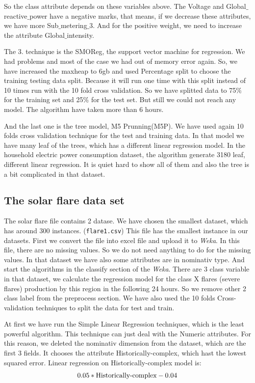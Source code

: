 \documentclass[a4paper]{article}
\begin{document}
So the class attribute depends on these variables above. The Voltage and Global$\_$reactive$\_$power have a negative marks, that means, if we decrease these attributes, we have more Sub$\_$metering$\_$3. And for the positive weight, we need to increase the attribute Global$\_$intensity.

The 3. technique is the SMOReg, the support vector machine for regression. We had problems and most of the case we had out of memory error again. So, we have increased the maxheap to 6gb and used Percentage split to choose the training testing data split. Because it will run one time with this split instead of 10 times run with the 10 fold cross validation. So we have splitted data to 75\% for the training set and 25\% for the test set. But still we could not reach any model. The algorithm have taken more than 6 hours.

And the last one is the tree model, M5 Prunning(M5P). We have used again 10 folds cross validation technique for the test and training data. In that model we have many leaf of the trees, which has a different linear regression model. In the household electric power consumption dataset, the algorithm generate 3180 leaf, different linear regression. It is quiet hard to show all of them and also the tree is a bit complicated in that dataset.

\subsection{The solar flare data set}
The solar flare file contains 2 datase. We have chosen the smallest dataset, which has around 300 instances. ({\tt flare1.csv}) This file has the smallest instance in our datasets. First we convert the file into excel file and upload it to \emph{Weka}. In this file, there are no missing values. So we do not need anything to do for the missing values. In that dataset we have also some attributes are in nominativ type. And start the algorithms in the classify section of the \emph{Weka}. There are 3 class variable in that dataset, we calculate the regression model for the class X flares (severe flares) production by this region in the following 24 hours. So we remove other 2 class label from the preprocess section. We have also used the 10 folds Cross-validation techniques to split the data for test and train. 

At first we have run the Simple Linear Regression techniques, which is the least powerful algorithm. This technique can just deal with the Numeric attributes. For this reason, we deleted the nominativ dimension from the dataset, which are the first 3 fields. It chooses the attribute Historically-complex, which hast the lowest squared error. Linear regression on Historically-complex model is: 
\begin{equation*}
    0.05 * \textnormal{Historically-complex} - 0.04
\end{equation*}
\end{document}
